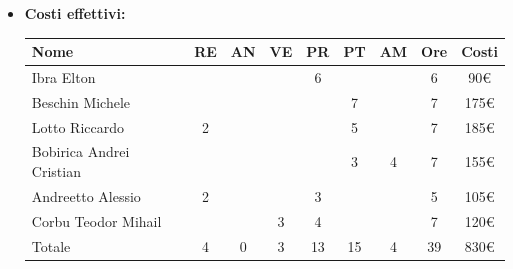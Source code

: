 \begin{itemize}
\begin{longtable}{|c|c|c|c|}
        \hline
        \end{longtable}
    \item \textbf{Costi effettivi:}
    \begin{longtable}{|p{}|c|c|c|c|c|c|c|c|}
        \hline
        Nome & RE & AN & VE & PR & PT & AM & Ore & Costi\\
        \hline
        Ibra \newline Elton & & & &6 & & &6 & 90€\\
        \hline
        Beschin Michele & & & & &7 & &7 & 175€\\
        \hline
        Lotto \newline Riccardo &2 & & & &5 & &7 & 185€\\
        \hline
        Bobirica Andrei Cristian & & & & &3 &4 &7 & 155€\\
        \hline
        Andreetto Alessio &2 & & &3 & & &5 & 105€\\
        \hline
        Corbu Teodor Mihail & & &3 &4 & & &7 & 120€\\
        \hline
        Totale &4 &0 &3 &13 &15 &4 &39 & 830€\\
 
        \hline
    \end{longtable}
    \end{itemize}

